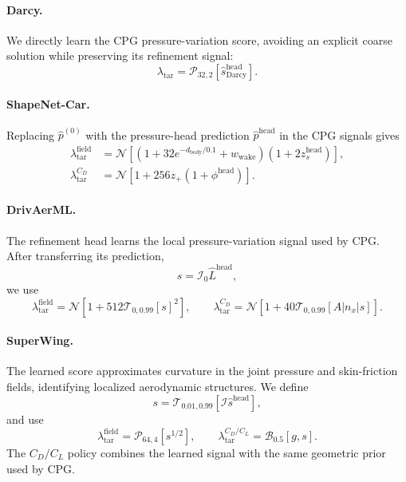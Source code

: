 \paragraph{Darcy.}
We directly learn the CPG pressure-variation score, avoiding an explicit coarse
solution while preserving its refinement signal:
\begin{equation}
    \lambda_{\mathrm{tar}}
    =\mathcal{P}_{32,2}
       [\widehat s_{\mathrm{Darcy}}^{\mathrm{head}}].
    \label{eq:app_ca_darcy_density}
\end{equation}

\paragraph{ShapeNet-Car.}
Replacing $\widehat p^{(0)}$ with the pressure-head prediction
$\widehat p^{\mathrm{head}}$ in the CPG signals gives
\begin{equation}
    \begin{aligned}
    \lambda_{\mathrm{tar}}^{\mathrm{field}}
        &=\mathcal{N}\!\left[
            (1+32e^{-d_{\mathrm{body}}/0.1}+w_{\mathrm{wake}})
            (1+2z_s^{\mathrm{head}})
          \right],\\
    \lambda_{\mathrm{tar}}^{C_D}
        &=\mathcal{N}[1+256z_+(1+\phi^{\mathrm{head}})].
    \end{aligned}
    \label{eq:app_ca_car_density}
\end{equation}

\paragraph{DrivAerML.}
The refinement head learns the local pressure-variation signal used by CPG.
After transferring its prediction,
\[
    s=\mathcal{I}_0\widehat L^{\mathrm{head}},
\]
we use
\begin{equation}
    \lambda_{\mathrm{tar}}^{\mathrm{field}}
    =\mathcal{N}\!\left[
        1+512\mathcal{T}_{0,0.99}[s]^2
    \right],
    \qquad
    \lambda_{\mathrm{tar}}^{C_D}
    =\mathcal{N}\!\left[
        1+40\mathcal{T}_{0,0.99}[A|n_x|s]
    \right].
    \label{eq:app_ca_drivaerml_density}
\end{equation}

\paragraph{SuperWing.}
The learned score approximates curvature in the joint pressure and
skin-friction fields, identifying localized aerodynamic structures. We define
\[
    s
    =\mathcal{T}_{0.01,0.99}
       [\mathcal{I}\widehat s^{\mathrm{head}}],
\]
and use
\begin{equation}
    \lambda_{\mathrm{tar}}^{\mathrm{field}}
    =\mathcal{P}_{64,4}[s^{1/2}],
    \qquad
    \lambda_{\mathrm{tar}}^{C_D/C_L}
    =\mathcal{B}_{0.5}[g,s].
    \label{eq:app_ca_superwing_density}
\end{equation}
The $C_D/C_L$ policy combines the learned signal with the same geometric prior
used by CPG.